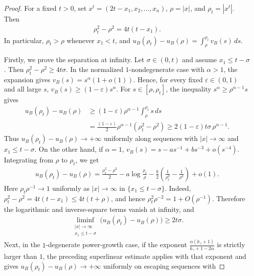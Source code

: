 \documentclass{amsart}
\theoremstyle{plain}
\theoremstyle{mainintrothm}
\theoremstyle{definition}
\begin{document}
	\begin{proof}
		For a fixed $t>0$, set $x^t=(2t-x_1,x_2,\ldots,x_n)$,
		$\rho=|x|$, and $\rho_t=|x^t|$.  Then
		\begin{align}
			\label{eq:reflected-radius-difference}
			\rho_t^2-\rho^2=4t(t-x_1).
		\end{align}
		In particular, $\rho_t>\rho$ whenever $x_1<t$, and
		$u_B(\rho_t)-u_B(\rho)=\int_\rho^{\rho_t}v_B(s)\,ds$.
		
		\medskip
		
	Firstly, we prove the separation at infinity.  Let $\sigma\in(0,t)$ and assume $x_1\le t-\sigma$.  Then $\rho_t^2-\rho^2\ge4t\sigma$. In the normalized $1$-nondegenerate case with $\alpha>1$, the expansion gives $v_B(s)=s^\alpha(1+o(1))$.  Hence, for every fixed $\varepsilon\in(0,1)$ and all large $s$, $v_B(s)\ge(1-\varepsilon)s^\alpha$. For $s\in[\rho,\rho_t]$, the inequality $s^\alpha\ge\rho^{\alpha-1}s$ gives
		\begin{align*}
			u_B(\rho_t)-u_B(\rho)
			&\ge
			(1-\varepsilon)\rho^{\alpha-1}\int_\rho^{\rho_t}s\,ds  \\
			&=
			\frac{(1-\varepsilon)}{2}\rho^{\alpha-1}(\rho_t^2-\rho^2)
			\ge
			2(1-\varepsilon)t\sigma\,\rho^{\alpha-1}.
		\end{align*}
		Thus $u_B(\rho_t)-u_B(\rho)\to+\infty$ uniformly along sequences with
		$|x|\to\infty$ and $x_1\le t-\sigma$. On the other hand, if  $\alpha=1$,
		$v_B(s)=s-as^{-1}+bs^{-3}+o(s^{-4})$.  Integrating from $\rho$ to
		$\rho_t$, we get
		\begin{align*}
			u_B(\rho_t)-u_B(\rho)
			=
			\frac{\rho_t^2-\rho^2}{2}
			-
			a\log\frac{\rho_t}{\rho}
			-
			\frac{b}{2}
			\left(\frac{1}{\rho_t^2}-\frac{1}{\rho^2}\right)
			+
			o(1).
		\end{align*}
		Here $\rho_t\rho^{-1}\to1$ uniformly as $|x|\to\infty$ in
		$\{x_1\le t-\sigma\}$.  Indeed,
		$\rho_t^2-\rho^2=4t(t-x_1)\le4t(t+\rho)$, and hence
		$\rho_t^2\rho^{-2}=1+O(\rho^{-1})$.  Therefore the logarithmic and
		inverse-square terms vanish at infinity, and
		\begin{align*}
			\liminf\limits_{\substack{|x|\to\infty\\ x_1\le t-\sigma}}
			\bigl(u_B(\rho_t)-u_B(\rho)\bigr)
			\ge
			2t\sigma .
		\end{align*}
		Next, in the $1$-degenerate power-growth case, if the exponent
		$\frac{\alpha(k_\gamma+1)}{k_\gamma+1-2\alpha}$ is strictly larger than $1$,
		the preceding superlinear estimate applies with that exponent and gives
		$u_B(\rho_t)-u_B(\rho)\to+\infty$ uniformly on escaping sequences with

\end{proof}
\end{document}

